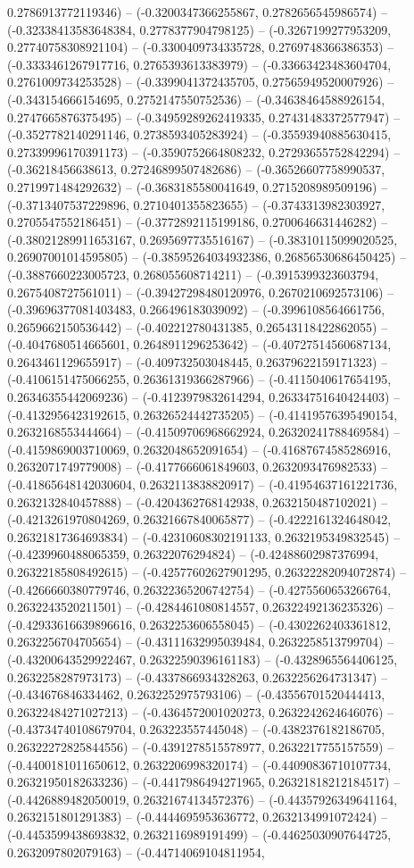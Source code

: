 0.2786913772119346) -- (-0.3200347366255867, 0.2782656545986574) -- (-0.32338413583648384, 0.2778377904798125) -- (-0.3267199277953209, 0.27740758308921104) -- (-0.3300409734335728, 0.2769748366386353) -- (-0.3333461267917716, 0.2765393613383979) -- (-0.33663423483604704, 0.2761009734253528) -- (-0.3399041372435705, 0.27565949520007926) -- (-0.343154666154695, 0.2752147550752536) -- (-0.34638464588926154, 0.2747665876375495) -- (-0.34959289262419335, 0.27431483372577947) -- (-0.3527782140291146, 0.2738593405283924) -- (-0.35593940885630415, 0.27339996170391173) -- (-0.3590752664808232, 0.27293655752842294) -- (-0.36218456638613, 0.27246899507482686) -- (-0.36526607758990537, 0.2719971484292632) -- (-0.3683185580041649, 0.2715208989509196) -- (-0.3713407537229896, 0.2710401355823655) -- (-0.3743313982303927, 0.2705547552186451) -- (-0.3772892115199186, 0.2700646631446282) -- (-0.38021289911653167, 0.2695697735516167) -- (-0.38310115099020525, 0.26907001014595805) -- (-0.38595264034932386, 0.26856530686450425) -- (-0.3887660223005723, 0.268055608714211) -- (-0.3915399323603794, 0.2675408727561011) -- (-0.39427298480120976, 0.2670210692573106) -- (-0.39696377081403483, 0.266496183039092) -- (-0.3996108564661756, 0.2659662150536442) -- (-0.402212780431385, 0.26543118422862055) -- (-0.4047680514665601, 0.2648911296253642) -- (-0.40727514560687134, 0.2643461129655917) -- (-0.409732503048445, 0.26379622159171323) -- (-0.4106151475066255, 0.26361319366287966) -- (-0.4115040617654195, 0.26346355442069236) -- (-0.4123979832614294, 0.26334751640424403) -- (-0.4132956423192615, 0.26326524442735205) -- (-0.41419576395490154, 0.2632168553444664) -- (-0.41509706968662924, 0.26320241788469584) -- (-0.4159869003710069, 0.2632048652091654) -- (-0.41687674585286916, 0.2632071749779008) -- (-0.4177666061849603, 0.2632093476982533) -- (-0.41865648142030604, 0.2632113838820917) -- (-0.41954637161221736, 0.2632132840457888) -- (-0.4204362768142938, 0.2632150487102021) -- (-0.4213261970804269, 0.26321667840065877) -- (-0.4222161324648042, 0.26321817364693834) -- (-0.42310608302191133, 0.2632195349832545) -- (-0.4239960488065359, 0.26322076294824) -- (-0.42488602987376994, 0.26322185808492615) -- (-0.42577602627901295, 0.26322282094072874) -- (-0.4266660380779746, 0.26322365206742754) -- (-0.4275560653266764, 0.2632243520211501) -- (-0.4284461080814557, 0.26322492136235326) -- (-0.42933616639896616, 0.2632253606558045) -- (-0.4302262403361812, 0.2632256704705654) -- (-0.43111632995039484, 0.2632258513799704) -- (-0.43200643529922467, 0.26322590396161183) -- (-0.4328965564406125, 0.2632258287973173) -- (-0.4337866934328263, 0.2632256264731347) -- (-0.434676846334462, 0.2632252975793106) -- (-0.43556701520444413, 0.26322484271027213) -- (-0.4364572001020273, 0.2632242624646076) -- (-0.43734740108679704, 0.263223557445048) -- (-0.4382376182186705, 0.26322272825844556) -- (-0.4391278515578977, 0.2632217755157559) -- (-0.4400181011650612, 0.2632206998320174) -- (-0.44090836710107734, 0.26321950182633236) -- (-0.4417986494271965, 0.26321818212184517) -- (-0.4426889482050019, 0.26321674134572376) -- (-0.44357926349641164, 0.2632151801291383) -- (-0.4444695953636772, 0.2632134991072424) -- (-0.4453599438693832, 0.2632116989191499) -- (-0.44625030907644725, 0.2632097802079163) -- (-0.44714069104811954, 